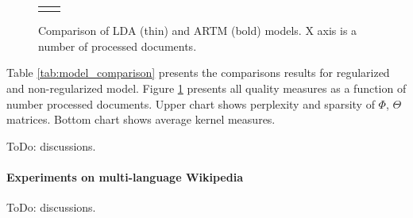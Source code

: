 \documentclass{llncs}
\begin{document}
\begin{figure}[h!]
\begin{tabular}{cc}

&

\end{tabular}
\caption{Comparison of LDA (thin) and ARTM (bold) models. X axis is a number of processed documents.}
\label{fig:comparison_plot}
\end{figure}

Table \ref{tab:model_comparison} presents the comparisons results for regularized and non-regularized model.
Figure \ref{fig:comparison_plot} presents all quality measures as a function of number processed documents.
Upper chart shows perplexity and sparsity of $\Phi$, $\Theta$ matrices.
Bottom chart shows average kernel measures.

{\color{red}ToDo: discussions.}

\paragraph{Experiments on multi-language Wikipedia}

{\color{red}ToDo: discussions.}
\end{document}
